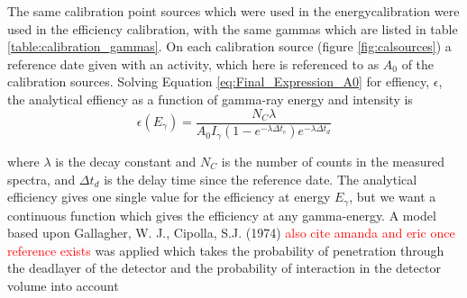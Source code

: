 The same calibration point sources which were used in the energycalibration were used in the efficiency calibration, with the same gammas which are listed in table \ref{table:calibration_gammas}. On each calibration source (figure \ref{fig:calsources}) a reference date given with an activity, which here is referenced to as $A_0$ of the calibration sources. \noindent Solving Equation \ref{eq:Final_Expression_A0} for effiency, $\epsilon$, the analytical effiency as a function of gamma-ray energy and intensity is 
\begin{equation} \label{eq:efficiency_analytical}
    \epsilon(E_\gamma)= \frac{N_C \lambda}{A_0 I_\gamma (1-e^{-\lambda \Delta t_c})e^{-\lambda\Delta t_d}}
\end{equation}

\noindent 
where $\lambda$ is the decay constant and $N_C$ is the number of counts in the measured spectra, and $\Delta t_d$ is the delay time since the reference date. The analytical efficiency gives one single value for the efficiency at energy $E_\gamma$, but we want a continuous function which gives the efficiency at any gamma-energy. A model based upon Gallagher, W. J., Cipolla, S.J. (1974)\cite{Gallagher1974b} \textcolor{red}{also cite amanda and eric once reference exists} was applied which takes the probability of penetration through the deadlayer of the detector and the probability of interaction in the detector volume into account

